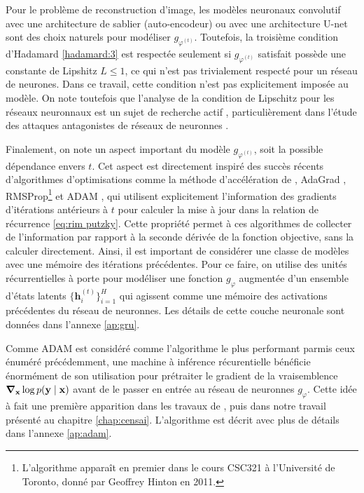Pour le problème de reconstruction d'image, les modèles neuronaux convolutif avec une architecture de sablier (auto-encodeur) ou 
avec une architecture U-net \citep{Ronneberger2015} sont des choix naturels pour modéliser $g_{\varphi^{(t)}}$. 
Toutefois, la troisième condition d'Hadamard \ref{hadamard:3} est respectée seulement si $g_{\varphi^{(t)}}$ 
satisfait possède une constante de Lipshitz $L\leq 1$, ce qui n'est pas trivialement respecté pour un réseau de neurones.
Dans ce travail, cette condition n'est pas explicitement imposée au modèle. 
On note toutefois que l'analyse de la condition de Lipschitz pour les réseaux neuronnaux est un 
sujet de recherche actif \citep[e.g.][]{}, particulièrement dans l'étude des attaques antagonistes de réseaux de neuronnes \citep[e.g.][]{}. 

Finalement, on note un aspect important du modèle $g_{\varphi^{(t)}}$, soit la possible dépendance envers $t$. Cet aspect 
est directement inspiré des succès récents d'algorithmes d'optimisations comme la méthode d'accélération de \citet{Nesterov1983}, 
AdaGrad \citep{Duchi2011}, RMSProp\footnote{L'algorithme apparaît en premier dans le cours CSC321 à l'Université de Toronto, donné par Geoffrey Hinton en 2011.} \citep{Hinton2012} 
et ADAM \citep{Kingma2014},
qui utilisent explicitement l'information 
des gradients d'itérations antérieurs à $t$ pour calculer la mise à jour dans la relation de récurrence \eqref{eq:rim putzky}.
Cette propriété permet à ces algorithmes de collecter de l'information par rapport à la seconde dérivée de la fonction 
objective, sans la calculer directement.
Ainsi, il est important de considérer une classe de modèles avec une mémoire des itérations précédentes. Pour ce 
faire, on utilise des unités récurrentielles à porte \citep[de l'anglais \textit{gated recurrent units}:][]{Cho2014} 
pour modéliser une fonction $g_{\varphi}$ augmentée d'un ensemble d'états latents $\{\mathbf{h}^{(t)}_i\}_{i=1}^{H}$ 
qui agissent comme une mémoire des activations précédentes du réseau de neuronnes. Les détails 
de cette couche neuronale sont données dans l'annexe \ref{ap:gru}. 

Comme ADAM est considéré comme l'algorithme le plus performant parmis ceux énuméré précédemment, 
une machine à inférence récurentielle bénéficie énormément de son utilisation pour 
prétraiter le gradient de la vraisemblence $\grad_{\mathbf{x}}\log p(\mathbf{y} \mid \mathbf{x})$ 
avant de le passer en entrée au réseau de neuronnes $g_{\varphi}$. 
Cette idée à fait une première apparition dans les travaux de 
\citet{Modi2021}, puis dans notre travail présenté au chapitre \ref{chap:censai}. 
L'algorithme est décrit avec plus de détails dans l'annexe \ref{ap:adam}.


